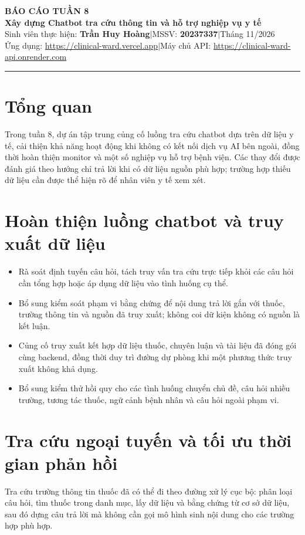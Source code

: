 \documentclass[11pt,a4paper]{article}
\begin{document}
\begin{center}
    {\Large\textbf{BÁO CÁO TUẦN 8}}\\[0.18em]
    {\large\textbf{Xây dựng Chatbot tra cứu thông tin và hỗ trợ nghiệp vụ y tế}}\\[0.25em]
    Sinh viên thực hiện: \textbf{Trần Huy Hoàng}\quad $|$\quad MSSV: \textbf{20237337}\quad $|$\quad Tháng 11/2026\\[0.12em]
    Ứng dụng: \url{https://clinical-ward.vercel.app}\quad $|$\quad Máy chủ API: \url{https://clinical-ward-api.onrender.com}
\end{center}
\noindent\textcolor{medblue}{\rule{\textwidth}{0.7pt}}

\section{Tổng quan}
Trong tuần 8, dự án tập trung củng cố luồng tra cứu chatbot dựa trên dữ liệu y tế, cải thiện khả năng hoạt động khi không có kết nối dịch vụ AI bên ngoài, đồng thời hoàn thiện monitor và một số nghiệp vụ hỗ trợ bệnh viện. Các thay đổi được đánh giá theo hướng chỉ trả lời khi có dữ liệu nguồn phù hợp; trường hợp thiếu dữ liệu cần được thể hiện rõ để nhân viên y tế xem xét.

\section{Hoàn thiện luồng chatbot và truy xuất dữ liệu}
\begin{itemize}
    \item Rà soát định tuyến câu hỏi, tách truy vấn tra cứu trực tiếp khỏi các câu hỏi cần tổng hợp hoặc áp dụng dữ liệu vào tình huống cụ thể.
    \item Bổ sung kiểm soát phạm vi bằng chứng để nội dung trả lời gắn với thuốc, trường thông tin và nguồn đã truy xuất; không coi dữ kiện không có nguồn là kết luận.
    \item Củng cố truy xuất kết hợp dữ liệu thuốc, chuyên luận và tài liệu đã đóng gói cùng backend, đồng thời duy trì đường dự phòng khi một phương thức truy xuất không khả dụng.
    \item Bổ sung kiểm thử hồi quy cho các tình huống chuyển chủ đề, câu hỏi nhiều trường, tương tác thuốc, ngữ cảnh bệnh nhân và câu hỏi ngoài phạm vi.
\end{itemize}

\section{Tra cứu ngoại tuyến và tối ưu thời gian phản hồi}
Tra cứu trường thông tin thuốc đã có thể đi theo đường xử lý cục bộ: phân loại câu hỏi, tìm thuốc trong danh mục, lấy dữ liệu và bằng chứng từ cơ sở dữ liệu, sau đó dựng câu trả lời mà không cần gọi mô hình sinh nội dung cho các trường hợp phù hợp.
\end{document}
